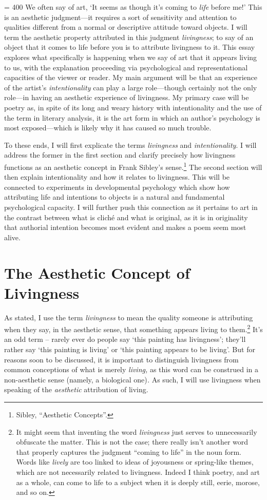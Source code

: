 \pretolerance = 400
We often say of art, `It seems as though it's coming to \emph{life}
before me!' This is an aesthetic judgment---it requires a sort of
sensitivity and attention to qualities different from a normal or
descriptive attitude toward objects. I will term the aesthetic property
attributed in this judgment \emph{livingness}; to say of an object that
it comes to life before you is to attribute livingness to it. This essay
explores what specifically is happening when we say of art that it
appears living to us, with the explanation proceeding via psychological
and representational capacities of the viewer or reader. My main
argument will be that an experience of the artist's
\emph{intentionality} can play a large role---though certainly not the
only role---in having an aesthetic experience of livingness. My primary
case will be poetry as, in spite of its long and weary history with
intentionality and the use of the term in literary analysis, it is the
art form in which an author's psychology is most exposed---which is
likely why it has caused so much trouble.

To these ends, I will first explicate the terms \emph{livingness} and
\emph{intentionality}. I will address the former in the first section
and clarify precisely how livingness functions as an aesthetic concept
in Frank Sibley's sense.\footnote{Sibley, ``Aesthetic Concepts''.} The
second section will then explain intentionality and how it relates to
livingness. This will be connected to experiments in developmental
psychology which show how attributing life and intentions to objects is
a natural and fundamental psychological capacity. I will further push
this connection as it pertains to art in the contrast between what is
cliché and what is original, as it is in originality that authorial
intention becomes most evident and makes a poem seem most alive.

\section{The Aesthetic Concept of Livingness}


As stated, I use the term \emph{livingness} to mean the quality someone
is attributing when they say, in the aesthetic sense, that something
appears living to them.\footnote{It might seem that inventing the word
  \emph{livingness} just serves to unnecessarily obfuscate the matter.
  This is not the case; there really isn't another word that properly
  captures the judgment ``coming to life'' in the noun form. Words like
  \emph{lively} are too linked to ideas of joyousness or spring-like
  themes, which are not necessarily related to livingness. Indeed I
  think poetry, and art as a whole, can come to life to a subject when
  it is deeply still, eerie, morose, and so on.} It's an odd term --
rarely ever do people say `this painting has livingness'; they'll rather
say `this painting is living' or `this painting appears to be living'.
But for reasons soon to be discussed, it is important to distinguish
livingness from common conceptions of what is merely \emph{living,} as
this word can be construed in a non-aesthetic sense (namely, a
biological one)\emph{.} As such, I will use livingness when speaking of
the \emph{aesthetic} attribution of living.

